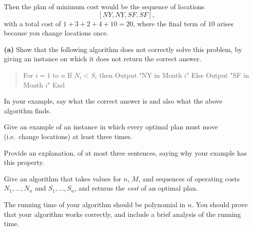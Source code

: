 \documentclass[12pt]{article}
\begin{document}
\begin{enumerate}
Then the plan of minimum cost would be the sequence of locations
$$[NY, NY, SF, SF],$$
with a total cost of
$1 + 3 + 2 + 4 + 10 = 20$, where the final term
of $10$ arises because you change locations once.

\bigskip
{\bf (a)}  Show that the following algorithm does not
correctly solve this problem, by giving an instance on which
it does not return the correct answer.
\begin{quote}
\begin{code}
For $i = 1$ to $n$
  If $N_i < S_i$ then
    Output "NY in Month $i$"
  Else
    Output "SF in Month $i$"
End
\end{code}
\end{quote}
In your example, say what the correct answer is and
also what the above algorithm finds.

Give an example of an instance in which every optimal plan
must move (i.e.~change locations) at least three times.

Provide an explanation, of at most three sentences, saying
why your example has this property.

Give an algorithm that takes values for $n$, $M$,
and sequences of operating costs
$N_1, \ldots, N_n$ and $S_1, \ldots, S_n$,
and returns the {\em cost} of an optimal plan.

The running time of your algorithm should be polynomial in $n$.
You should prove that your algorithm works correctly, and include a
brief analysis of the running time.

\end{enumerate}
\end{document}
